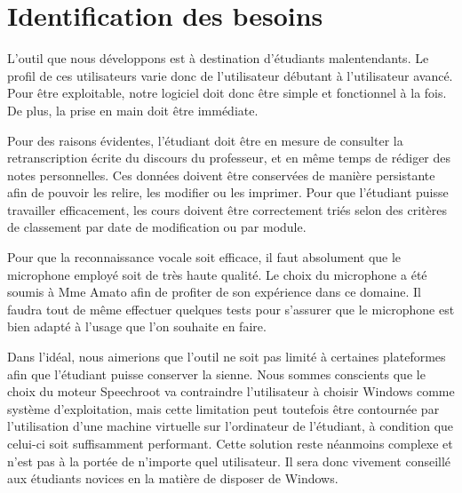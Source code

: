 \chapter{Identification des besoins}

L'outil que nous développons est à destination d'étudiants malentendants.
Le profil de ces utilisateurs varie donc de l'utilisateur débutant à l'utilisateur avancé.
Pour être exploitable, notre logiciel doit donc être simple et fonctionnel à la fois. De plus, la prise en main doit être immédiate.

Pour des raisons évidentes, l'étudiant doit être en mesure de consulter la retranscription écrite du discours du professeur, et en même temps de rédiger des notes personnelles.
Ces données doivent être conservées de manière persistante afin de pouvoir les relire, les modifier ou les imprimer.
Pour que l'étudiant puisse travailler efficacement, les cours doivent être correctement triés selon des critères de classement par date de modification ou par module.

Pour que la reconnaissance vocale soit efficace, il faut absolument que le microphone employé soit de très haute qualité.
Le choix du microphone a été soumis à Mme Amato afin de profiter de son expérience dans ce domaine.
Il faudra tout de même effectuer quelques tests pour s'assurer que le microphone est bien adapté à l'usage que l'on souhaite en faire.

Dans l'idéal, nous aimerions que l'outil ne soit pas limité à certaines plateformes afin que l'étudiant puisse conserver la sienne.
Nous sommes conscients que le choix du moteur Speechroot va contraindre l'utilisateur à choisir Windows comme système d'exploitation, mais cette limitation peut toutefois être contournée par l'utilisation d'une machine virtuelle sur l'ordinateur de l'étudiant, à condition que celui-ci soit suffisamment performant.
Cette solution reste néanmoins complexe et n'est pas à la portée de n'importe quel utilisateur.
Il sera donc vivement conseillé aux étudiants novices en la matière de disposer de Windows.


